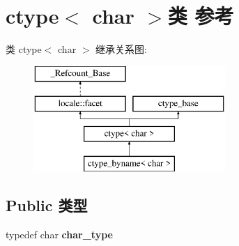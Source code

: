\hypertarget{classctype_3_01char_01_4}{}\section{ctype$<$ char $>$类 参考}
\label{classctype_3_01char_01_4}
类 ctype$<$ char $>$ 继承关系图\+:\begin{figure}[H]
\begin{center}
\leavevmode
\includegraphics[height=4.000000cm]{classctype_3_01char_01_4}
\end{center}
\end{figure}
\subsection*{Public 类型}
\begin{DoxyCompactItemize}
\item 
\mbox{\label{classctype_3_01char_01_4_a1ad267f962d6bb3aeff82cce606a0220}} 
typedef char {\bfseries char\+\_\+type}
\end{DoxyCompactItemize}
